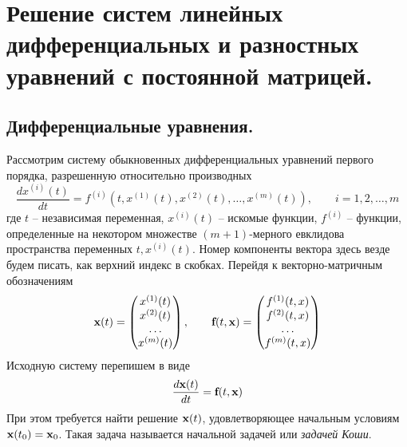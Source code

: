 \documentclass[../../calc-math-exam-2023.tex]{subfiles}
\begin{document}
    \section{Решение систем линейных дифференциальных и разностных уравнений с постоянной матрицей.}\label{sec:ch18}

    \subsection{Дифференциальные уравнения.}
    Рассмотрим систему обыкновенных дифференциальных уравнений первого порядка, разрешенную относительно
    производных
    \begin{equation*}
        \frac{dx^{(i)}(t)}{dt} = f^{(i)}\left( t, x^{(1)}(t), x^{(2)}(t), \dots, x^{(m)}(t) \right), \qquad i=1,2,\dots,m
    \end{equation*}
    где $t$ -- независимая переменная, $\displaystyle x^{(i)}(t)$ -- искомые функции,
    $\displaystyle f^{(i)}$ -- функции, определенные на некотором множестве $(m+1)$-мерного евклидова пространства
    переменных $t, x^{(i)}(t)$. Номер компоненты вектора здесь везде будем писать, как верхний индекс в скобках.
    Перейдя к векторно-матричным обозначениям
    \begin{equation*}
        \bf{x}(t) =
        \begin{pmatrix}
            x^{(1)}(t) \\
            x^{(2)}(t) \\
            \dots      \\
            x^{(m)}(t)
        \end{pmatrix}
        , \qquad
        \bf{f}(t, \bf{x}) =
        \begin{pmatrix}
            f^{(1)}(t, x) \\
            f^{(2)}(t, x) \\
            \dots         \\
            f^{(m)}(t, x) \\
        \end{pmatrix}
    \end{equation*}
    Исходную систему перепишем в виде
    \begin{equation}
        \frac{d\bf{x}(t)}{dt} = \bf{f}(t, \bf{x}) \label{eq:matrix_differential_equation_definition}
    \end{equation}
    При этом требуется найти решение $\bf{x}(t)$, удовлетворяющее начальным условиям $\displaystyle \bf{x}(t_0) = \bf{x}_0$.
    Такая задача называется начальной задачей или \emph{задачей Коши}.
\end{document}
